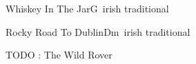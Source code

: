 \begin{song}{Whiskey In The Jar}{G}{~}{irish traditional}{}{}
	
\end{song}

\begin{song}{Rocky Road To Dublin}{Dm}{~}{irish traditional}{}{}
	
\end{song}

TODO : The Wild Rover